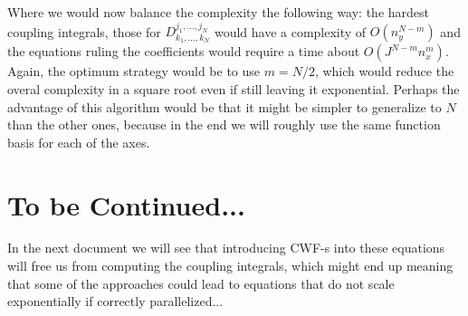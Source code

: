 \documentclass[11pt, a4paper]{article} %
\begin{document}
Where we would now balance the complexity the following way: the hardest coupling integrals, those for $D^{j_1,...,j_N}_{k_1,...,k_N}$ would have a complexity of $O(n_y^{N-m})$ and the equations ruling the coefficients would require a time about $O(J^{N-m}n_x^m)$. Again, the optimum strategy would be to use $m=N/2$, which would reduce the overal complexity in a square root even if still leaving it exponential. Perhaps the advantage of this algorithm would be that it might be simpler to generalize to $N$ than the other ones, because in the end we will roughly use the same function basis for each of the axes.


\newpage

\section*{To be Continued...}
In the next document we will see that introducing CWF-s into these equations will free us from computing the coupling integrals, which might end up meaning that some of the approaches could lead to equations that do not scale exponentially if correctly parallelized...
















 


\end{document}

